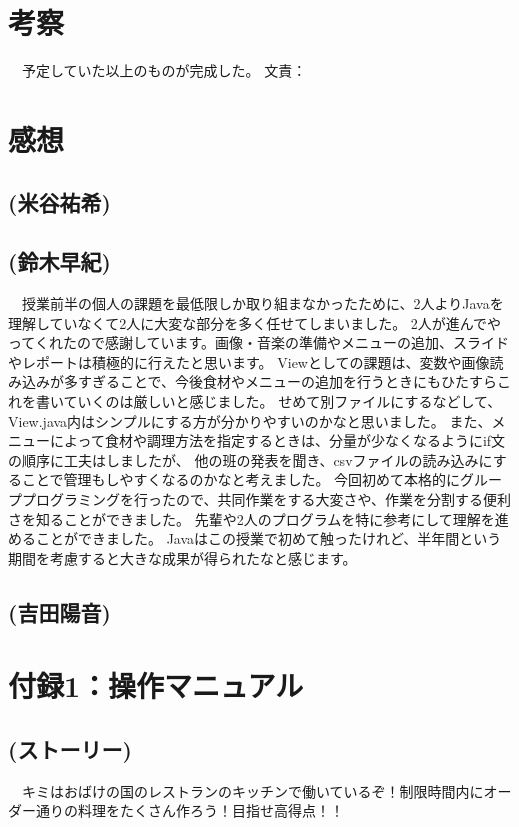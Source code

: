 \documentclass[a4j]{jarticle} %
\begin{document}
\newpage

\section{考察}
　予定していた以上のものが完成した。%
文責：%

\section{感想}
\subsection*{(米谷祐希)}
\subsection*{(鈴木早紀)}
　授業前半の個人の課題を最低限しか取り組まなかったために、2人よりJavaを理解していなくて2人に大変な部分を多く任せてしまいました。
2人が進んでやってくれたので感謝しています。画像・音楽の準備やメニューの追加、スライドやレポートは積極的に行えたと思います。
Viewとしての課題は、変数や画像読み込みが多すぎることで、今後食材やメニューの追加を行うときにもひたすらこれを書いていくのは厳しいと感じました。
せめて別ファイルにするなどして、View.java内はシンプルにする方が分かりやすいのかなと思いました。
また、メニューによって食材や調理方法を指定するときは、分量が少なくなるようにif文の順序に工夫はしましたが、
他の班の発表を聞き、csvファイルの読み込みにすることで管理もしやすくなるのかなと考えました。
今回初めて本格的にグループプログラミングを行ったので、共同作業をする大変さや、作業を分割する便利さを知ることができました。
先輩や2人のプログラムを特に参考にして理解を進めることができました。
Javaはこの授業で初めて触ったけれど、半年間という期間を考慮すると大きな成果が得られたなと感じます。
\subsection*{(吉田陽音)}


\newpage
\section*{付録1：操作マニュアル}
\subsection*{(ストーリー)}
　キミはおばけの国のレストランのキッチンで働いているぞ！制限時間内にオーダー通りの料理をたくさん作ろう！目指せ高得点！！
\end{document}
